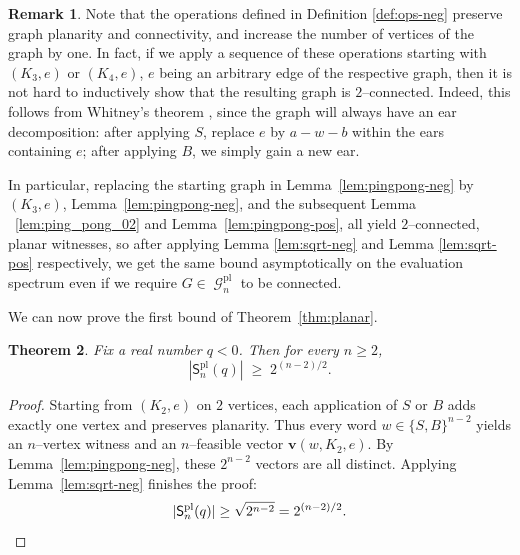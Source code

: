 \documentclass[A4paper,reqno,oneside,12pt]{amsart}
\theoremstyle{plain}
\newtheorem{theorem}{Theorem}[section]
\theoremstyle{definition}
\newtheorem{remark}[theorem]{Remark}
\DeclareMathOperator{\pl}{\mathrm{pl}}
\DeclareMathOperator{\mG}{\mathcal{G}}
\begin{document}
\begin{remark}
    \label{rmk:2-connec}
    Note that the operations defined in Definition \ref{def:ops-neg} preserve graph planarity and connectivity, and increase the number of vertices of the graph by one. In fact, if we apply a sequence of these operations starting with $(K_3, e)$ or $(K_4,e)$, $e$ being an arbitrary edge of the respective graph, then it is not hard to inductively show that the resulting graph is $2$--connected. Indeed, this follows from Whitney's theorem \cite{WhitneyEar}, since the graph will always have an ear decomposition: after applying $S$, replace $e$ by $a-w-b$ within the ears containing $e$; after applying $B$, we simply gain a new ear.    

    In particular, replacing the starting graph in Lemma~\ref{lem:pingpong-neg} by $(K_3, e)$, Lemma~\ref{lem:pingpong-neg}, and the subsequent Lemma ~\ref{lem:ping_pong_02} and Lemma~\ref{lem:pingpong-pos}, all yield $2$--connected, planar witnesses, so after applying Lemma \ref{lem:sqrt-neg} and Lemma \ref{lem:sqrt-pos} respectively, we get the same bound asymptotically on the evaluation spectrum even if we require $G\in \mG_n^{\pl}$ to be connected.  
\end{remark}

We can now prove the first bound of Theorem~\ref{thm:planar}.

\begin{theorem}\label{thm:negative}
Fix a real number $q<0$. Then for every $n\ge 2$,
\[
|\mathsf{S}^{\pl}_n(q)| \;\ge\; 2^{(n-2)/2}.
\]
\end{theorem}

\begin{proof}
Starting from $(K_2,e)$ on $2$ vertices, each application of $S$ or $B$ adds exactly one vertex and preserves planarity.
Thus every word $w\in\{S,B\}^{n-2}$ yields an $n$--vertex witness and an $n$--feasible vector
$\mathbf{v}(w, K_2,e)$. 
By Lemma~\ref{lem:pingpong-neg}, these $2^{n-2}$ vectors are all distinct.
Applying Lemma~\ref{lem:sqrt-neg} finishes the proof:
\[
|\mathsf{S}^{\pl}_n(q)|\ge \sqrt{2^{n-2}}=2^{(n-2)/2}.\qedhere
\]
\end{proof}
\end{document}
